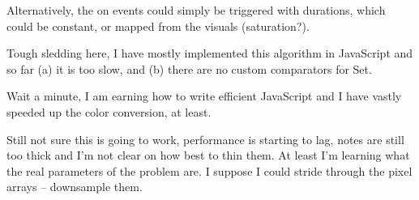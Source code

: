 \documentclass[english,11pt,letterpaper,onecolumn]{scrartcl}
\begin{document}
Alternatively, the on events could simply be triggered with durations, which 
could be constant, or mapped from the visuals (saturation?).

Tough sledding here, I have mostly implemented this algorithm in JavaScript 
and so far (a) it is too slow, and (b) there are no custom comparators for Set.

Wait a minute, I am earning how to write efficient JavaScript and I have 
vastly speeded up the color conversion, at least.

Still not sure this is going to work, performance is starting to lag, notes 
are still too thick and I'm not clear on how best to thin them. At least I'm 
learning what the real parameters of the problem are. I suppose I could stride 
through the pixel arrays -- downsample them.
\end{document}
